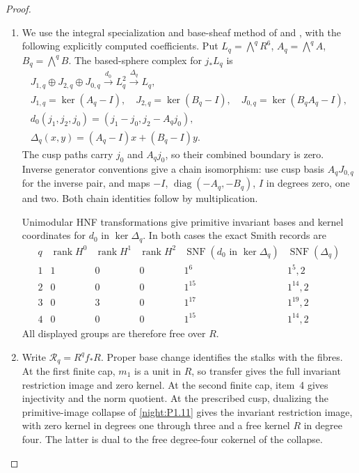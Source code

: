 \begin{proof}
\begin{enumerate}[label={$\langle1\rangle$\arabic*.}]
\[\]
\item We use the integral specialization and base-sheaf method
of \cite[Lemma~7.25 and Propositions~7.26--7.27, pp.~61--63]{AC26}
and \cite[section ``The integral homology'']{E26}, with the
following explicitly computed coefficients.  Put
$L_q=\bigwedge^qR^6$, $A_q=\bigwedge^qA$, $B_q=\bigwedge^qB$.
The based-sphere complex for $j_*L_q$ is
\[
\begin{gathered}
 J_{1,q}\oplus J_{2,q}\oplus J_{0,q}
 \xrightarrow{d_0} L_q^2\xrightarrow{\Delta_q}L_q,\\
 J_{1,q}=\ker(A_q-I),\quad J_{2,q}=\ker(B_q-I),\quad
 J_{0,q}=\ker(B_qA_q-I),\\
 d_0(j_1,j_2,j_0)=(j_1-j_0,j_2-A_qj_0),\\
 \Delta_q(x,y)=(A_q-I)x+(B_q-I)y.
\end{gathered}
\]
The cusp paths carry $j_0$ and $A_qj_0$, so their combined
boundary is zero.  Inverse generator conventions give a chain
isomorphism: use cusp basis $A_qJ_{0,q}$ for the inverse pair,
and maps $-I$, $\operatorname{diag}(-A_q,-B_q)$, $I$ in degrees
zero, one and two.  Both chain identities follow by multiplication.

Unimodular HNF transformations give primitive invariant bases
and kernel coordinates for $d_0$ in $\ker\Delta_q$.  In both cases
the exact Smith records are
\[
\begin{array}{c|ccc|c|c}
q&\operatorname{rank}H^0&\operatorname{rank}H^1&\operatorname{rank}H^2
 &\operatorname{SNF}(d_0\text{ in }\ker\Delta_q)
 &\operatorname{SNF}(\Delta_q)\\\hline
1&1&0&0&1^6&1^5,2\\
2&0&0&0&1^{15}&1^{14},2\\
3&0&3&0&1^{17}&1^{19},2\\
4&0&0&0&1^{15}&1^{14},2
\end{array}
\]
All displayed groups are therefore free over $R$.

\item Write $\mathcal R_q=R^qf_*R$.  Proper base change
\cite[Tag~09V5, Lemma~20.18.1]{StacksProject} identifies the stalks
with the fibres.  At the first finite cap, $m_1$ is a
unit in $R$, so transfer gives the full invariant restriction
image and zero kernel.  At the second finite cap, item~4 gives
injectivity and the norm quotient.  At the prescribed cusp,
dualizing the primitive-image collapse of
\cref{night:P1.11} gives the invariant restriction image, with
zero kernel in degrees one through three and a free kernel $R$
in degree four.  The latter is dual to the free degree-four
cokernel of the collapse.


\end{enumerate}
\end{proof}
